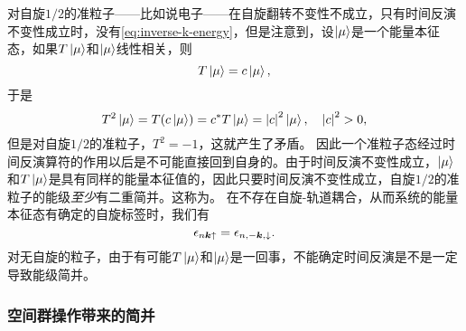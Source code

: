 对自旋$1/2$的准粒子——比如说电子——在自旋翻转不变性不成立，只有时间反演不变性成立时，没有\eqref{eq:inverse-k-energy}，但是注意到，设$\ket{\mu}$是一个能量本征态，如果$T \ket{\mu}$和$\ket{\mu}$线性相关，则
\[
    T \ket{\mu} = c \ket{\mu},
\]
于是
\[
    T^2 \ket{\mu} = T(c \ket{\mu}) = c^* T \ket{\mu} = \abs{c}^2 \ket{\mu}, \quad \abs{c}^2 > 0,
\]
但是对自旋$1/2$的准粒子，$T^2 = -1$，这就产生了矛盾。
因此一个准粒子态经过时间反演算符的作用以后是不可能直接回到自身的。由于时间反演不变性成立，$\ket{\mu}$和$T \ket{\mu}$是具有同样的能量本征值的，因此只要时间反演不变性成立，自旋$1/2$的准粒子的能级\emph{至少}有二重简并。这称为。
在不存在自旋-轨道耦合，从而系统的能量本征态有确定的自旋标签时，我们有
\begin{equation}
    \epsilon_{n \vb*{k} \uparrow} = \epsilon_{n, -\vb*{k}, \downarrow}.
\end{equation}
对无自旋的粒子，由于有可能$T \ket{\mu}$和$\ket{\mu}$是一回事，不能确定时间反演是不是一定导致能级简并。

\subsubsection{空间群操作带来的简并} 

